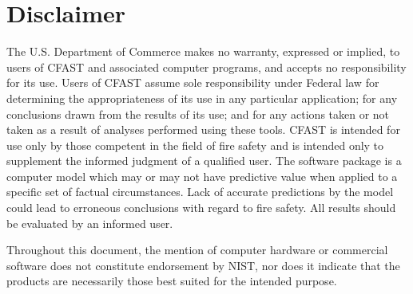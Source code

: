 \chapter{Disclaimer}

The U.S. Department of Commerce makes no warranty, expressed or implied, to users of CFAST and associated computer programs, and accepts no responsibility for its use.  Users of CFAST assume sole responsibility under Federal law for determining the appropriateness of its use in any particular application; for any conclusions drawn from the results of its use; and for any actions taken or not taken as a result of analyses performed using these tools.
CFAST is intended for use only by those competent in the field of fire safety and is intended only to supplement the informed judgment of a qualified user. The software package is a computer model which may or may not have predictive value when applied to a specific set of factual circumstances. Lack of accurate predictions by the model could lead to erroneous conclusions with regard to fire safety. All results should be evaluated by an informed user.

Throughout this document, the mention of computer hardware or commercial software does not constitute endorsement by NIST, nor does it indicate that the products are necessarily those best suited for the intended purpose.